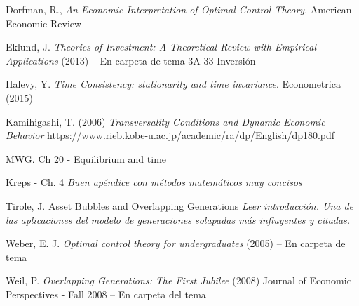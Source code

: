 \documentclass{nuevotema}
\begin{document}
Dorfman, R., \textit{An Economic Interpretation of Optimal Control Theory}. American Economic Review

Eklund, J. \textit{Theories of Investment: A Theoretical Review with Empirical Applications} (2013) -- En carpeta de tema 3A-33 Inversión

Halevy, Y. \textit{Time Consistency: stationarity and time invariance}. Econometrica (2015)

Kamihigashi, T. (2006) \textit{Transversality Conditions and Dynamic Economic Behavior} \url{https://www.rieb.kobe-u.ac.jp/academic/ra/dp/English/dp180.pdf} 

MWG. Ch 20 - Equilibrium and time

Kreps - Ch. 4 \textit{Buen apéndice con métodos matemáticos muy concisos}





Tirole, J. Asset Bubbles and Overlapping Generations
\textit{Leer introducción. Una de las aplicaciones del modelo de generaciones solapadas más influyentes y citadas.}

Weber, E. J. \textit{Optimal control theory for undergraduates} (2005) -- En carpeta de tema

Weil, P. \textit{Overlapping Generations: The First Jubilee} (2008) Journal of Economic Perspectives - Fall 2008 -- En carpeta del tema
\end{document}
